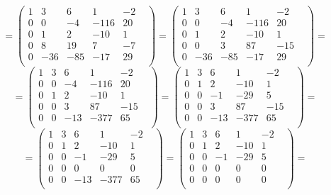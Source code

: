 \documentclass[a4paper,12pt]{article}
\begin{document}
\[
=
\begin{pmatrix}
1 & 3 & 6 & 1 & -2 & \\
0 & 0 & -4 & -116 & 20 & \\
0 & 1 & 2 & -10 & 1 & \\
0 & 8 & 19 & 7 & -7 & \\
0 & -36 & -85 & -17 & 29 & \\
\end{pmatrix}
=
\begin{pmatrix}
1 & 3 & 6 & 1 & -2 & \\
0 & 0 & -4 & -116 & 20 & \\
0 & 1 & 2 & -10 & 1 & \\
0 & 0 & 3 & 87 & -15 & \\
0 & -36 & -85 & -17 & 29 & \\
\end{pmatrix}
=
\]
\[
=
\begin{pmatrix}
1 & 3 & 6 & 1 & -2 & \\
0 & 0 & -4 & -116 & 20 & \\
0 & 1 & 2 & -10 & 1 & \\
0 & 0 & 3 & 87 & -15 & \\
0 & 0 & -13 & -377 & 65 & \\
\end{pmatrix}
=
\begin{pmatrix}
1 & 3 & 6 & 1 & -2 & \\
0 & 1 & 2 & -10 & 1 & \\
0 & 0 & -1 & -29 & 5 & \\
0 & 0 & 3 & 87 & -15 & \\
0 & 0 & -13 & -377 & 65 & \\
\end{pmatrix}
=
\]
\[
=
\begin{pmatrix}
1 & 3 & 6 & 1 & -2 & \\
0 & 1 & 2 & -10 & 1 & \\
0 & 0 & -1 & -29 & 5 & \\
0 & 0 & 0 & 0 & 0 & \\
0 & 0 & -13 & -377 & 65 & \\
\end{pmatrix}
=
\begin{pmatrix}
1 & 3 & 6 & 1 & -2 & \\
0 & 1 & 2 & -10 & 1 & \\
0 & 0 & -1 & -29 & 5 & \\
0 & 0 & 0 & 0 & 0 & \\
0 & 0 & 0 & 0 & 0 & \\
\end{pmatrix} =
\]
\end{document}
